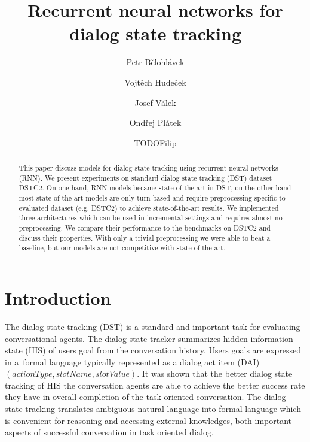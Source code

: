 \documentclass{itatnew}
\begin{document}
\title{Recurrent neural networks for dialog state tracking}

\author{Petr Bělohlávek \and Vojtěch Hudeček \and
Josef Válek \and Ondřej Plátek \and TODOFilip}


\maketitle              %

\begin{abstract}
This paper discuss models for dialog state tracking using recurrent neural networks (RNN).
We present experiments on standard dialog state tracking (DST) dataset DSTC2\cite{todo}.
On one hand, RNN models became state of the art in DST,
on the other hand most state-of-the-art models are only turn-based and require preprocessing specific to evaluated dataset (e.g. DSTC2) to achieve state-of-the-art results.
We implemented three architectures which can be used in incremental settings and requires almost no preprocessing.
We compare their performance to the benchmarks on DSTC2 and discuss their properties.
With only a trivial preprocessing we were able to beat a baseline, but our models are not competitive with state-of-the-art.
\end{abstract}
%
\section{Introduction}
%
The dialog state tracking (DST) is a standard and important task for evaluating conversational agents\cite{dstc1, dstc2, dstc3, HIS model}.
The dialog state tracker summarizes hidden information state (HIS) \cite{todo} of users goal from the conversation history.
Users goals are expressed in a~formal language typically represented as a dialog act item (DAI) $(actionType, slotName, slotValue)$.
It was shown that the better dialog state tracking of HIS the conversation agents are able to achieve the better success rate they have in overall completion of the task oriented conversation.\cite{Steve Yound, Henderson,..Zilka, Alex}
The dialog state tracking translates ambiguous natural language into formal language which is convenient for reasoning and accessing external knowledges, both important aspects of successful conversation in task oriented dialog.
\end{document}
